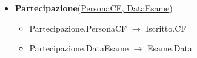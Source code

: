 \documentclass[10pt,twoside]{article}
\begin{document}
{{\begin{itemize}
            \begin{itemize}
                \item Pagamento.Iscritto $\rightarrow$ Iscritto.CF
            \end{itemize}
            \item \textbf{Partecipazione}(\underline{PersonaCF, DataEsame})
            \begin{itemize}
                \item Partecipazione.PersonaCF $\rightarrow$ Iscritto.CF
                \item Partecipazione.DataEsame $\rightarrow$ Esame.Data
            \end{itemize}
        \end{itemize}
    }

}
\end{document}
